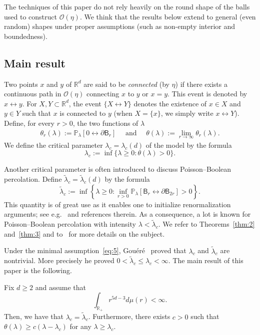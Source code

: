 \documentclass[AHL,Unicode,longabstracts]{cedram}
\begin{document}
\begin{rema}
The techniques of this paper do not rely heavily on the round shape of the balls used to construct $\mathcal O(\eta)$. We think that the results below extend to general (even random) shapes under proper assumptions (such as non-empty interior and boundedness).
\end{rema}

\subsection{Main result}
Two points $x$ and $y$ of ${\mathbb R}^d$ are said to be \emph{connected} (by $\eta$) if there exists a continuous path in ${\mathcal O}(\eta)$ connecting $x$ to $y$ or $x = y$. This event is denoted by $x\longleftrightarrow y$. For $X, Y \subset {\mathbb R}^d$, the event $\{X\longleftrightarrow Y\}$ denotes the existence of $x \in X$ and $y \in Y$ such that $x$ is connected to $y$ (when $X=\{x\}$, we simply write $x\longleftrightarrow Y$). Define, for every $r>0$, the two functions of $\lambda$
\begin{align*}
\theta_r(\lambda):={\mathbb P}_\lambda[0\stackrel{}\longleftrightarrow \partial\mathsf B_r]\quad\text{ and }\quad\theta(\lambda):=\lim_{r\rightarrow\infty}\theta_r(\lambda).
\end{align*}
We define the critical parameter $\lambda_c=\lambda_c(d)$ of the model by the formula
\[
\lambda_c:=\inf\{\lambda\ge 0:\theta(\lambda)>0\}.
\]


Another critical parameter is often introduced to discuss Poisson--Boolean percolation. Define $\widetilde\lambda_c=\widetilde\lambda_c(d)$ by the formula
\[
\widetilde\lambda_c:=\inf\left\{\lambda\ge0:\inf_{r>0}{\mathbb P}_\lambda[\mathsf B_r\stackrel{}{\longleftrightarrow}\partial\mathsf B_{2r}]>0\right\}.
\]
This quantity is of great use as it enables one to initialize renormalization arguments; see e.g.~\cite{Gou1,Gou2} and references therein. As a consequence, a lot is known for Poisson--Boolean percolation with intensity $\lambda<\widetilde\lambda_c$. We refer to Theorems~\ref{thm:2} and~\ref{thm:3} and to~\cite{MeeRoy08} for more details on the subject.

Under the minimal assumption~\eqref{eq:5}, Gouéré~\cite{Gou1} proved that $\lambda_c$ and $\widetilde{\lambda}_c$ are nontrivial. More precisely he proved $0<\widetilde\lambda_c\le\lambda_c <\infty$. The main result of this paper is the following.
\begin{theo}\label{thm:main}
Fix $d\ge2$ and assume that
\begin{equation}
\int_{{\mathbb R}_+} r^{5d-3}d\mu(r)<\infty.\label{eq:7}
\end{equation}
Then, we have that $\lambda_c=\widetilde\lambda_c$. Furthermore, there exists $c>0$ such that $\theta(\lambda)\ge c(\lambda-\lambda_c)$ for any $\lambda\ge \lambda_c$.
\end{theo}
\end{document}

